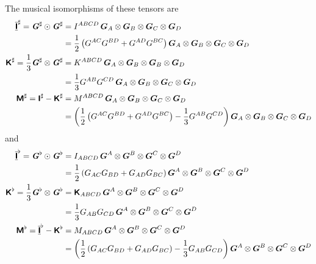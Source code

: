The musical isomorphisms of these tensors are
\begin{align}
     \overline{\underline{\boldsymbol{\mathsf{ I }}}}  ^{\sharp} =
    \boldsymbol{\mathit{G}}^{\sharp}  \odot  \boldsymbol{\mathit{G}}^{\sharp}   &=
   I ^{ABCD}\,  \boldsymbol{G} _{A} \otimes  \boldsymbol{G} _{B} \otimes  \boldsymbol{G} _{C} \otimes  \boldsymbol{G} _{D} 
  \\ \nonumber
  &=
  \dfrac{1}{2}\left( G^{AC}G^{BD}+G^{AD}G^{BC} \right)  \boldsymbol{G} _{A} \otimes  \boldsymbol{G} _{B} \otimes  \boldsymbol{G} _{C} \otimes  \boldsymbol{G} _{D} 
  \\
     \boldsymbol{\mathsf{ K }}  ^{\sharp} =
  \dfrac{1}{3}  \boldsymbol{\mathit{G}}^{\sharp}  \otimes  \boldsymbol{\mathit{G}}^{\sharp}  &=
   K ^{ABCD}\,  \boldsymbol{G} _{A} \otimes  \boldsymbol{G} _{B} \otimes  \boldsymbol{G} _{B} \otimes  \boldsymbol{G} _{D} 
  \\ \nonumber
  &=\dfrac{1}{3}G^{AB}G^{CD}\,  \boldsymbol{G} _{A} \otimes  \boldsymbol{G} _{B} \otimes  \boldsymbol{G} _{C} \otimes  \boldsymbol{G} _{D} 
  \\
     \boldsymbol{\mathsf{ M }}  ^{\sharp} =
     \boldsymbol{\mathsf{ I }}  ^{\sharp} -   \boldsymbol{\mathsf{ K }}  ^{\sharp} &=
   M ^{ABCD}\,  \boldsymbol{G} _{A} \otimes  \boldsymbol{G} _{B} \otimes  \boldsymbol{G} _{C} \otimes  \boldsymbol{G} _{D} 
  \\ \nonumber
  &=\left( \dfrac{1}{2}\left( G^{AC}G^{BD}+G^{AD}G^{BC} \right)-\dfrac{1}{3}G^{AB}G^{CD} \right)  \boldsymbol{G} _{A} \otimes  \boldsymbol{G} _{B} \otimes  \boldsymbol{G} _{C} \otimes  \boldsymbol{G} _{D} 
\end{align}
and
\begin{align}
    \overline{\underline{\boldsymbol{\mathsf{ I }}}}  ^{\flat}=
   \boldsymbol{\mathit{G}}^{\flat} \odot \boldsymbol{\mathit{G}}^{\flat} &=
   I _{ABCD}\,  \boldsymbol{G} ^{A} \otimes  \boldsymbol{G} ^{B} \otimes  \boldsymbol{G} ^{C} \otimes  \boldsymbol{G} ^{D} 
  \\ \nonumber
  &=\dfrac{1}{2}\left( G_{AC}G_{BD}+G_{AD}G_{BC} \right)  \boldsymbol{G} ^{A} \otimes  \boldsymbol{G} ^{B} \otimes  \boldsymbol{G} ^{C} \otimes  \boldsymbol{G} ^{D} 
  \\
    \boldsymbol{\mathsf{ K }}  ^{\flat}=
  \dfrac{1}{3} \boldsymbol{\mathit{G}}^{\flat} \otimes \boldsymbol{\mathit{G}}^{\flat} &=
    \boldsymbol{\mathsf{ K }}  _{ABCD}\,  \boldsymbol{G} ^{A} \otimes  \boldsymbol{G} ^{B} \otimes  \boldsymbol{G} ^{C} \otimes  \boldsymbol{G} ^{D} 
  \\ \nonumber
  &=\dfrac{1}{3}G_{AB}G_{CD}\,  \boldsymbol{G} ^{A} \otimes  \boldsymbol{G} ^{B} \otimes  \boldsymbol{G} ^{C} \otimes  \boldsymbol{G} ^{D} 
  \\
    \boldsymbol{\mathsf{ M }}  ^{\flat}=
    \overline{\underline{\boldsymbol{\mathsf{ I }}}}  ^{\flat}-  \boldsymbol{\mathsf{ K }}  ^{\flat}&=
   M _{ABCD}\,  \boldsymbol{G} ^{A} \otimes  \boldsymbol{G} ^{B} \otimes  \boldsymbol{G} ^{C} \otimes  \boldsymbol{G} ^{D} 
  \\ \nonumber
  &=\left( \dfrac{1}{2}\left( G_{AC}G_{BD}+G_{AD}G_{BC} \right)-\dfrac{1}{3}G_{AB}G_{CD} \right)  \boldsymbol{G} ^{A} \otimes  \boldsymbol{G} ^{B} \otimes  \boldsymbol{G} ^{C} \otimes  \boldsymbol{G} ^{D} 
\end{align}

